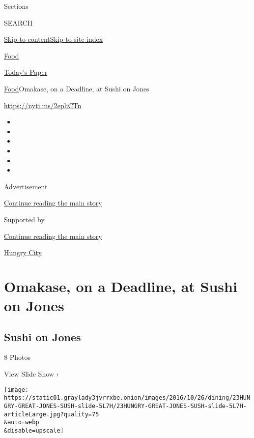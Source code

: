Sections

SEARCH

\protect\hyperlink{site-content}{Skip to
content}\protect\hyperlink{site-index}{Skip to site index}

\href{https://www.nytimes3xbfgragh.onion/section/food}{Food}

\href{https://myaccount.nytimes3xbfgragh.onion/auth/login?response_type=cookie\&client_id=vi}{}

\href{https://www.nytimes3xbfgragh.onion/section/todayspaper}{Today's
Paper}

\href{/section/food}{Food}\textbar{}Omakase, on a Deadline, at Sushi on
Jones

\url{https://nyti.ms/2ephCTn}

\begin{itemize}
\item
\item
\item
\item
\item
\item
\end{itemize}

Advertisement

\protect\hyperlink{after-top}{Continue reading the main story}

Supported by

\protect\hyperlink{after-sponsor}{Continue reading the main story}

\href{/column/hungry-city}{Hungry City}

\hypertarget{omakase-on-a-deadline-at-sushi-on-jones}{%
\section{Omakase, on a Deadline, at Sushi on
Jones}\label{omakase-on-a-deadline-at-sushi-on-jones}}

\href{https://www.nytimes3xbfgragh.onion/slideshow/2016/10/26/dining/sushi-on-jones.html}{}

\hypertarget{sushi-on-jones}{%
\subsection{Sushi on Jones}\label{sushi-on-jones}}

8 Photos

View Slide Show ›

\texttt{[image: https://static01.graylady3jvrrxbe.onion/images/2016/10/26/dining/23HUNGRY-GREAT-JONES-SUSH-slide-5L7H/23HUNGRY-GREAT-JONES-SUSH-slide-5L7H-articleLarge.jpg?quality=75\\\&auto=webp\\\&disable=upscale]}

